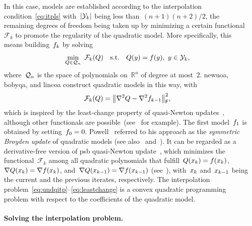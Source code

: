\documentclass[
    smallextended,  %
    final,          %
]{svjour3}
\newcommand{\R}{\mathbb{R}}
\newcommand{\abs}[2][]{#1\lvert#2#1\rvert}
\newcommand{\frob}{\mathsf{F}}
\newcommand{\func}{\mathcal{F}}
\newcommand{\iter}[1][k]{x\ifthenelse{\equal{#1}{}}{}{_{#1}}}
\newcommand{\norm}[2][]{#1\lVert#2#1\rVert}
\newcommand{\objm}[1][k]{\obj\ifthenelse{\equal{#1}{}}{}{_{#1}}}
\newcommand{\obj}{f}
\newcommand{\qspace}[1][n]{\mathcal{Q}\ifthenelse{\equal{#1}{}}{}{_{#1}}}
\newcommand{\st}{\text{s.t.}}
\newcommand{\xpt}[1][k]{\mathcal{Y}\ifthenelse{\equal{#1}{}}{}{_{#1}}}
\begin{document}
In this case, models are established according to the interpolation condition~\eqref{eq:itpls}
with~$\abs{\xpt}$ being less than~$(n + 1)(n + 2) / 2$, the remaining degrees of freedom being taken
up by minimizing a certain functional~$\func_k$ to promote the regularity of the quadratic model.
More specifically, this means building~$\objm$ by solving
\begin{equation}
    \label{eq:undqitp}
        \min_{Q \in \qspace} ~ \func_k(Q) \quad \st \quad Q(y) = \obj(y), ~ y \in \xpt,
\end{equation}
where~$\qspace$ is the space of polynomials on~$\R^n$ of degree at most~$2$.
\gls{newuoa}, \gls{bobyqa}, and \gls{lincoa} construct quadratic models in this way, with
\begin{equation}
    \label{eq:leastchange}
    \func_k(Q) = \norm[\big]{\nabla^2 Q - \nabla^2 \objm[k - 1]}_{\frob}^2,
\end{equation}
which is inspired by the least-change property of quasi-Newton updates~\cite{Dennis_Schnabel_1979},
although other functionals are possible~(see~\cite{Conn_Toint_1996,Bandeira_Scheinberg_Vicente_2012,Powell_2013,Zhang_2014,Xie_Yuan_2023} for example).
The first model~$\objm[1]$ is obtained by setting~$\objm[0] = 0$.
Powell~\cite{Powell_2013} referred to his approach as the \emph{symmetric Broyden update} of
quadratic models (see also~\cite[\S~3.6]{Zhang_2012} and~\cite[\S~2.4.2]{Ragonneau_2022}).
It can be regarded as a derivative-free version of \gls{psb} quasi-Newton update~\cite{Powell_1970b}, which minimizes the functional~$\func_k$ among all quadratic polynomials that fulfill~$Q(\iter) = \obj(\iter)$, $\nabla Q(\iter) = \nabla \obj(\iter)$, and~$\nabla Q(\iter[k - 1]) = \nabla \obj(\iter[k - 1])$ (see~\cite[Theorem~4.2]{Dennis_Schnabel_1979}), with~$\iter$ and~$\iter[k - 1]$ being the current and the previous iterates, respectively.
The interpolation problem~\mbox{\eqref{eq:undqitp}--\eqref{eq:leastchange}} is a convex quadratic
programming problem with respect to the coefficients of the quadratic model.

\paragraph{\textnormal{\textbf{Solving the interpolation problem.}}}
\end{document}
